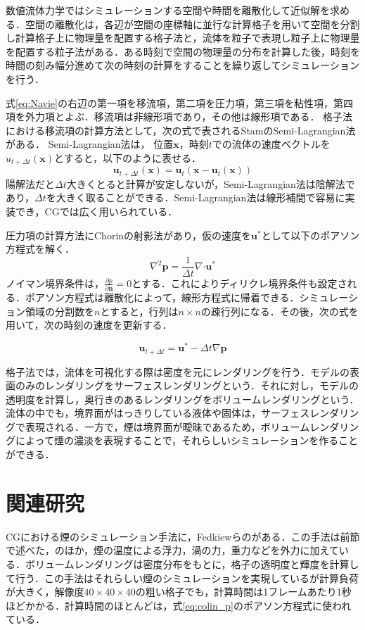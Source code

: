 \documentclass[10pt,a4paper,notitlepage,oneside,twocolumn]{abst_jsarticle}
\begin{document}
数値流体力学ではシミュレーションする空間や時間を離散化して近似解を求める．空間の離散化は，各辺が空間の座標軸に並行な計算格子を用いて空間を分割し計算格子上に物理量を配置する格子法と，流体を粒子で表現し粒子上に物理量を配置する粒子法がある．ある時刻で空間の物理量の分布を計算した後，時刻を時間の刻み幅分進めて次の時刻の計算をすることを繰り返してシミュレーションを行う．

式\ref{eq:Navie}の右辺の第一項を移流項，第二項を圧力項，第三項を粘性項，第四項を外力項とよぶ．移流項は非線形項であり，その他は線形項である．
格子法における移流項の計算方法として，次の式で表されるStamのSemi-Lagrangian法\cite{semi-Lagrangian}がある．
Semi-Lagrangian法は， 位置$\bm{x}$，時刻$t$での流体の速度ベクトルを${u}_{t+\Delta t}(\bm{x})$とすると，以下のように表せる．
$$\bm{u}_{t+\Delta t}(\bm{x}) = \bm{u}_t(\bm{x}-\bm{u}_t(\bm{x}))$$
陽解法だと$\Delta t$大きくとると計算が安定しないが，Semi-Lagrangian法は陰解法であり，$\Delta t$を大きく取ることができる．Semi-Lagrangian法は線形補間で容易に実装でき，CGでは広く用いられている．

圧力項の計算方法にChorinの射影法\cite{projection}があり，仮の速度を$\bm{u}^*$として以下のポアソン方程式を解く．
\begin{equation}\label{eq:colin_p}
\nabla^2 \bm{p} =  \frac{1}{\Delta t}\nabla\boldsymbol{\cdot}\bm{u}^*
\end{equation} 
ノイマン境界条件は，$\frac{\partial p}{\partial \bm{n}} = 0$とする．これによりディリクレ境界条件も設定される．ポアソン方程式は離散化によって，線形方程式に帰着できる．シミュレーション領域の分割数を$n$とすると，行列は$n \times n$の疎行列になる．その後，次の式を用いて，次の時刻の速度を更新する．

$$\bm{u}_{t+\Delta t} = \bm{u}^* - \Delta t \nabla \bm{p}$$

格子法では，流体を可視化する際は密度を元にレンダリングを行う．モデルの表面のみのレンダリングをサーフェスレンダリングという．それに対し，モデルの透明度を計算し，奥行きのあるレンダリングをボリュームレンダリングという．流体の中でも，境界面がはっきりしている液体や固体は，サーフェスレンダリングで表現される．一方で，煙は境界面が曖昧であるため，ボリュームレンダリングによって煙の濃淡を表現することで，それらしいシミュレーションを作ることができる．
\section{関連研究}
CGにおける煙のシミュレーション手法に，Fedkiewらの\cite{fedkiew}がある．この手法は前節で述べた\cite{semi-Lagrangian}，\cite{projection}のほか，煙の温度による浮力，渦の力，重力などを外力に加えている．ボリュームレンダリングは密度分布をもとに，格子の透明度と輝度を計算して行う．この手法はそれらしい煙のシミュレーションを実現しているが計算負荷が大きく，解像度$40\times40\times40$の粗い格子でも，計算時間は1フレームあたり1秒ほどかかる．計算時間のほとんどは，式\ref{eq:colin_p}のポアソン方程式に使われている．
\end{document}

